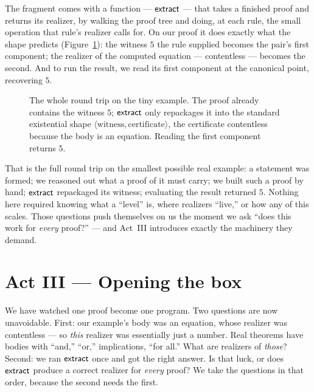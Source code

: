 \documentclass[11pt]{article}
\begin{document}
The fragment comes with a function --- $\mathsf{extract}$ --- that takes a finished
proof and returns its realizer, by walking the proof tree and doing, at each
rule, the small operation that rule's realizer calls for. On our proof it
does exactly what the shape predicts (Figure~\ref{fig:extract2}): the witness
$5$ the rule supplied becomes the pair's first component; the realizer of the
computed equation --- contentless --- becomes the second. And to run the
result, we read its first component at the canonical point, recovering $5$.

\begin{figure}[h]
\centering
{}
\caption{The whole round trip on the tiny example. The proof already
contains the witness $5$; $\mathsf{extract}$ only repackages it into the standard
existential shape $\langle\text{witness},\text{certificate}\rangle$, the
certificate contentless because the body is an equation. Reading the first
component returns $5$.}
\label{fig:extract2}
\end{figure}

That is the full round trip on the smallest possible real example: a
statement was formed; we reasoned out what a proof of it must carry; we built
such a proof by hand; $\mathsf{extract}$ repackaged its witness; evaluating the
result returned $5$. Nothing here required knowing what a ``level'' is, where
realizers ``live,'' or how any of this scales. Those questions push
themselves on us the moment we ask ``does this work for \emph{every} proof?''
--- and Act~III introduces exactly the machinery they demand.

\section{Act III --- Opening the box}

We have watched one proof become one program. Two questions are now
unavoidable. First: our example's body was an equation, whose realizer was
contentless --- so \emph{this} realizer was essentially just a number. Real
theorems have bodies with ``and,'' ``or,'' implications, ``for all.'' What
are realizers of \emph{those}? Second: we ran $\mathsf{extract}$ once and got the
right answer. Is that luck, or does $\mathsf{extract}$ produce a correct realizer for
\emph{every} proof? We take the questions in that order, because the second
needs the first.
\end{document}
